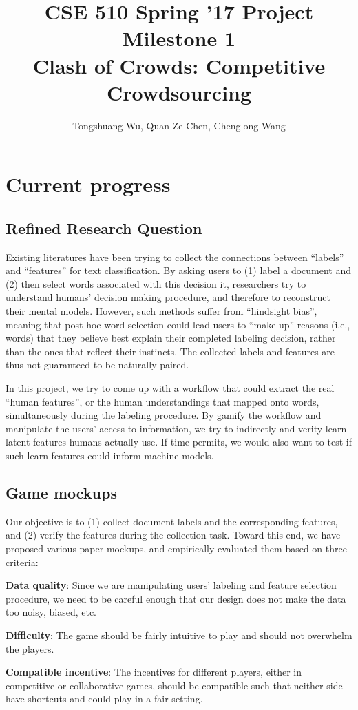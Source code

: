 \documentclass{article}
\title{{\large{CSE 510 Spring '17 Project Milestone 1}}
\\ \textbf{Clash of Crowds: Competitive Crowdsourcing}}
\author{Tongshuang Wu, Quan Ze Chen, Chenglong Wang}
\date{}
\begin{document}
\maketitle


\section{Current progress}

\subsection{Refined Research Question}

Existing literatures have been trying to collect the connections between  ``labels'' and ``features'' for text classification. 
By asking users to (1) label a document and (2) then select words associated with this decision it, researchers try to understand humans' decision making procedure, and therefore to reconstruct their mental models.
However, such methods suffer from ``hindsight bias'', meaning that post-hoc word selection could lead users to ``make up'' reasons (i.e., words) that they believe best explain their completed labeling decision, rather than the ones that reflect their instincts.
The collected labels and features are thus not guaranteed to be naturally paired.

In this project, we try to come up with a workflow that could extract the real ``human features'', or the human understandings that mapped onto words, simultaneously during the labeling procedure.
By gamify the workflow and manipulate the users' access to information, we try to indirectly and verity learn latent features humans actually use.
If time permits, we would also want to test if such learn features could inform machine models.

\subsection{Game mockups}
\label{sec:mockup}
Our objective is to (1) collect document labels and the corresponding features, and (2) verify the features during the collection task.
Toward this end, we have proposed various paper mockups, and empirically evaluated them based on three criteria:
\begin{compactitem}
	\item \textbf{Data quality}: Since we are manipulating users' labeling and feature selection procedure, we need to be careful enough that our design does not make the data too noisy, biased, etc.
	\item \textbf{Difficulty}: The game should be fairly intuitive to play and should not overwhelm the players. 
	\item \textbf{Compatible incentive}: The incentives for different players, either in competitive or collaborative games, should be compatible such that neither side have shortcuts and could play in a fair setting.
\end{compactitem}
 
\end{document}

